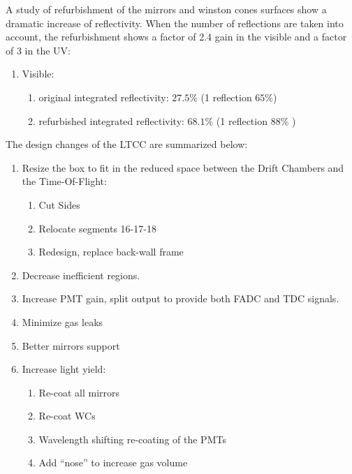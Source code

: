 A study of refurbishment of the mirrors and winston cones surfaces show a dramatic increase of
reflectivity. When the number of reflections are taken into account, the refurbishment shows
a factor of 2.4 gain in the visible and a factor of 3 in the UV:

\begin{enumerate}
	\item Visible:
	\begin{enumerate}
		\item original integrated reflectivity: $27.5\%$ (1 reflection $65\%$)
		\item refurbished integrated reflectivity: $68.1\%$  (1 reflection $88\%$ )
	\end{enumerate}
\end{enumerate}







The design changes of the LTCC are summarized below:

\begin{enumerate}
\item Resize the box to fit in the reduced space between the Drift Chambers and the Time-Of-Flight:
	\begin{enumerate}
		\item Cut Sides
		\item Relocate segments 16-17-18
		\item Redesign, replace back-wall frame
	\end{enumerate}

	\item Decrease inefficient regions.
	\item Increase PMT gain, split output to provide both FADC and TDC signals.
	\item Minimize gas leaks
	\item Better mirrors support
	\item Increase light yield:
	\begin{enumerate}
		\item Re-coat all mirrors
		\item Re-coat WCs
		\item Wavelength shifting re-coating of the PMTs
		\item Add “nose” to increase gas volume
	\end{enumerate}
\end{enumerate}






